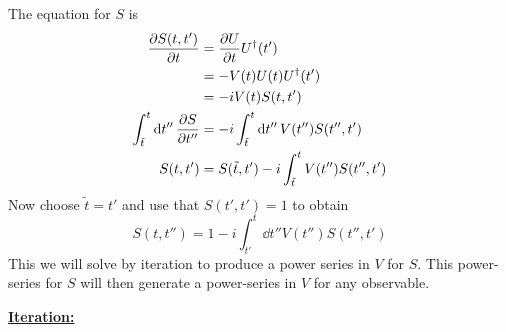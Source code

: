 The equation for $S$ is
\begin{align*} 
\pdv{S(t, t')}{t} &= \pdv{U}{t}U^\dagger(t') \\
&= -V(t)U(t)U^\dagger(t') \\
&= -iV(t)S(t, t') \\
\int_{\tilde{t}}^{t}\dd{t''}\pdv{S}{t''} &= -i\int_{\tilde{t}}^{t}\dd{t''}V(t'')S(t'', t') \\
S(t, t') &= S(\tilde{t}, t') -i \int_{\tilde{t}}^{t}V(t'')S(t'', t')
\end{align*}
Now choose $\tilde{t} = t'$ and use that $S(t',t') = 1$ to obtain
\begin{equation}
\label{eq:S_matrix_eq}
S(t, t'') = 1-i\int_{t'}^t\dd{t''}V(t'')S(t'', t')
\end{equation}
This we will solve by iteration to produce a power series in $V$ for $S$. This power-series for $S$ will then generate a power-series in $V$ for any observable.


\underline{\textbf{Iteration:}}

